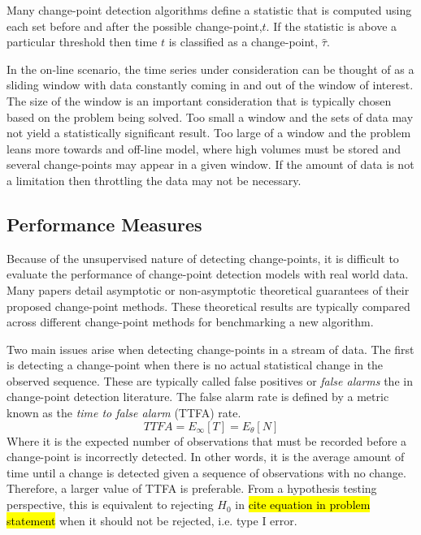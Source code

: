 Many change-point detection algorithms define a statistic that is computed using each set before and after the possible change-point,$t$. If the statistic is above a particular threshold then time $t$ is classified as a change-point, $\hat{\tau}$.

In the on-line scenario, the time series under consideration can be thought of as a sliding window with data constantly coming in and out of the window of interest. The size of the window is an important consideration that is typically chosen based on the problem being solved. Too small a window and the sets of data may not yield a statistically significant result. Too large of a window and the problem leans more towards and off-line model, where high volumes must be stored and several change-points may appear in a given window. If the amount of data is not a limitation then throttling the data may not be necessary.

\subsection{Performance Measures}
Because of the unsupervised nature of detecting change-points, it is difficult to evaluate the performance of change-point detection models with real world data. Many papers detail asymptotic or non-asymptotic theoretical guarantees of their proposed change-point methods.  These theoretical results are typically compared across different change-point methods for benchmarking a new algorithm.

Two main issues arise when detecting change-points in a stream of data. The first is detecting a change-point when there is no actual statistical change in the observed sequence. These are typically called false positives or \textit{false alarms} the in change-point detection literature. The false alarm rate is defined by a metric known as the \textit{time to false alarm} (TTFA) rate. 
\begin{equation}
TTFA = E_{\infty}[T] = E_{\theta}[N]
\end{equation}
Where it is the expected number of observations that must be recorded before a change-point is incorrectly detected. In other words, it is the average amount of time until a change is detected given a sequence of observations with no change. Therefore, a larger value of TTFA is preferable. From a hypothesis testing perspective, this is equivalent to rejecting $H_0$ in \hl{cite equation in problem statement} when it should not be rejected, i.e. type I error.

